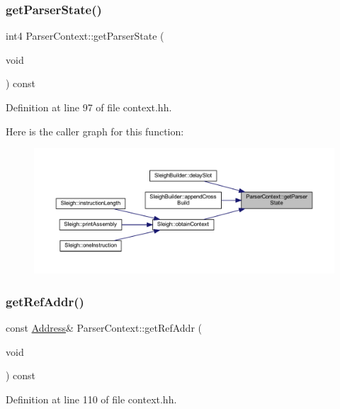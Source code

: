 \subsubsection{\texorpdfstring{getParserState()}{getParserState()}}
{\footnotesize\ttfamily int4 Parser\+Context\+::get\+Parser\+State (\begin{DoxyParamCaption}\item[{void}]{ }\end{DoxyParamCaption}) const\hspace{0.3cm}{\ttfamily [inline]}}



Definition at line 97 of file context.\+hh.

Here is the caller graph for this function\+:
\nopagebreak
\begin{figure}[H]
\begin{center}
\leavevmode
\includegraphics[width=350pt]{class_parser_context_a092b001f0511b580e0fed894baf20036_icgraph}
\end{center}
\end{figure}
\mbox{\label{class_parser_context_a98d90338dd2a0605dc74a220fa0a1eb7}} 
\subsubsection{\texorpdfstring{getRefAddr()}{getRefAddr()}}
{\footnotesize\ttfamily const \mbox{\hyperlink{class_address}{Address}}\& Parser\+Context\+::get\+Ref\+Addr (\begin{DoxyParamCaption}\item[{void}]{ }\end{DoxyParamCaption}) const\hspace{0.3cm}{\ttfamily [inline]}}



Definition at line 110 of file context.\+hh.


